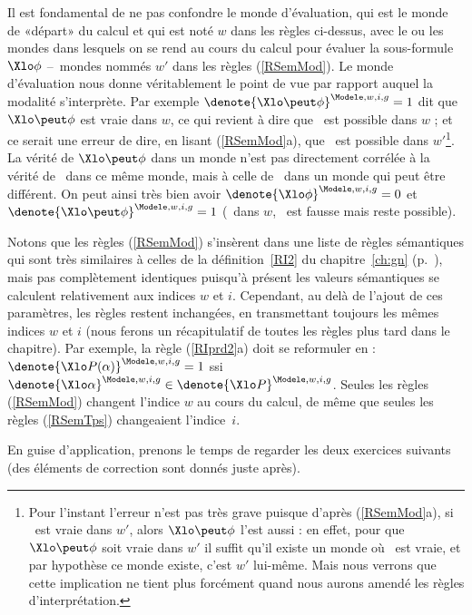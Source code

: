 Il est fondamental de ne pas confondre le monde d'évaluation, qui est le monde de «départ» du calcul et qui est
noté $w$ dans les règles ci-dessus, avec le ou les
mondes dans lesquels on se rend au cours du calcul pour évaluer
la sous-formule $\Xlo\phi$ --~mondes nommés $w'$ dans les règles
(\RSem\ref{RSemMod}).  
Le monde d'évaluation nous donne véritablement le point de vue par rapport auquel la modalité s'interprète.
Par exemple \(\denote{\Xlo\peut\phi}^{\Modele,w,i,g}=1\) dit que \(\Xlo\peut\phi\) est vraie dans $w$, ce qui revient à dire que \vrb\phi\ est possible dans $w$ ; et ce serait une erreur de dire, en lisant (\RSem\ref{RSemMod}a), que \vrb\phi\ est possible dans $w'$\footnote{Pour l'instant l'erreur n'est pas très grave puisque d'après (\RSem\ref{RSemMod}a), si \vrb\phi\ est vraie dans $w'$, alors $\Xlo\peut\phi$ l'est aussi : en effet, pour que $\Xlo\peut\phi$ soit vraie dans $w'$ il suffit qu'il existe un monde où \vrb\phi\ est vraie, et par hypothèse ce monde existe, c'est $w'$ lui-même. Mais nous verrons que cette implication ne tient plus forcément quand nous aurons amendé les règles d'interprétation.}. 
La vérité de \(\Xlo\peut\phi\) dans un monde n'est pas directement corrélée à la vérité de \vrb\phi\ dans ce même monde, mais à celle de \vrb\phi\ dans un monde qui peut être différent. On peut ainsi très bien avoir \(\denote{\Xlo\phi}^{\Modele,w,i,g}=0\) et \(\denote{\Xlo\peut\phi}^{\Modele,w,i,g}=1\) (\ie\ dans $w$, \vrb\phi\ est fausse mais reste possible).

Notons que les règles (\RSem\ref{RSemMod}) s'insèrent dans une liste de règles sémantiques qui sont très similaires à celles de la définition~\ref{RI2} du chapitre~\ref{ch:gn}  (p.~\pageref{RI2}), mais pas complètement identiques puisqu'à présent les valeurs sémantiques se calculent relativement aux indices $w$ et $i$. Cependant, au delà de l'ajout de ces paramètres, les règles restent inchangées, en transmettant toujours les mêmes indices $w$ et $i$ (nous ferons un récapitulatif de toutes les règles plus tard dans le chapitre).
Par exemple, la règle (\RSem\ref{RIprd2}a) doit se reformuler en : $\denote{\Xlo P(\alpha)}^{\Modele,w,i,g}=1$ ssi \(\denote{\Xlo\alpha}^{\Modele,w,i,g} \in
\denote{\Xlo P}^{\Modele,w,i,g}\). Seules les règles (\RSem\ref{RSemMod}) changent l'indice $w$ au cours du calcul, de même que seules les règles (\RSem\ref{RSemTps}) changeaient l'indice~$i$.

En guise d'application, prenons le temps de regarder les deux exercices suivants (des éléments de correction sont donnés juste après).

